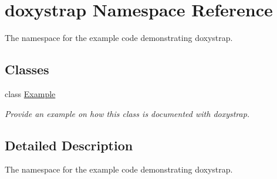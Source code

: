 \hypertarget{namespacedoxystrap}{}\section{doxystrap Namespace Reference}
\label{namespacedoxystrap}


The namespace for the example code demonstrating doxystrap.  


\subsection*{Classes}
\begin{DoxyCompactItemize}
\item 
class \hyperlink{classdoxystrap_1_1Example}{Example}
\begin{DoxyCompactList}\small\item\em Provide an example on how this class is documented with {\ttfamily doxystrap}. \end{DoxyCompactList}\end{DoxyCompactItemize}


\subsection{Detailed Description}
The namespace for the example code demonstrating doxystrap. 